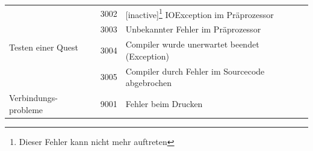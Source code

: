 \begin{minipage}{14cm}
\begin{tabular}{l|l|l}
	\multirow{4}{15mm}{\begin{sideways}\parbox{25mm}{Testen einer Quest}\end{sideways}}&3002&[inactive]\footnote{Dieser Fehler kann nicht mehr auftreten} IOException im Präprozessor\\
	&3003&Unbekannter Fehler im Präprozessor\\
	&3004&Compiler wurde unerwartet beendet (Exception)\\
	&3005&Compiler durch Fehler im Sourcecode abgebrochen\\
	\hline
	\parbox{23mm}{Verbindungs- probleme}&9001&Fehler beim Drucken
\end{tabular}
\end{minipage}

